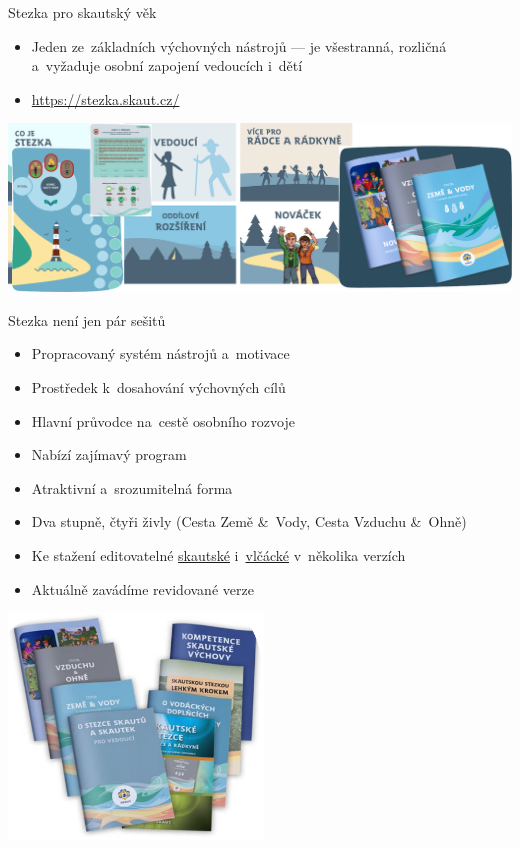\documentclass[compress, xelatex, 11pt, xcolor=dvipsnames, print, aspectratio=169,
	hyperref={
		bookmarks=true,
		unicode=true,
		colorlinks=true,
		pdftitle={Skautska vychovna metoda},
		plainpages=false,
		pdfauthor={Vojtech Zeisek},
		pdfsubject={Skautska vychovna metoda a jeji vyvoj za posledni stoleti a desetileti},
		pdfcreator={XeLaTeX},
		pdfkeywords={Junak, Pedagogika, Skaut, Skauting, Vychovna metoda},
		linkcolor=Red, %
		anchorcolor=ForestGreen, %
		citecolor=ForestGreen, %
		filecolor=ForestGreen, %
		menucolor=ForestGreen, %
		urlcolor=Sepia, %
		pdftex},
	url={hyphens, lowtilde} %
	]{beamer}
\begin{document}
\begin{frame}{Stezka pro skautský věk}
	\begin{itemize}
		\item Jeden ze~základních výchovných nástrojů --- je všestranná, rozličná a~vyžaduje osobní zapojení vedoucích i~dětí
		\item \url{https://stezka.skaut.cz/}
	\end{itemize}
	\begin{center}
		\includegraphics[width=\textwidth]{stezka.png}
	\end{center}
\end{frame}

\begin{frame}{Stezka není jen pár sešitů}
	\begin{multicols}{2}
		\begin{itemize}
			\item Propracovaný systém nástrojů a~motivace
			\item Prostředek k~dosahování výchovných cílů
			\item Hlavní průvodce na~cestě osobního rozvoje
			\item Nabízí zajímavý program
			\item Atraktivní a~srozumitelná forma
			\item Dva stupně, čtyři živly (Cesta Země \&~Vody, Cesta Vzduchu \&~Ohně)
			\item Ke stažení editovatelné \href{https://krizovatka.skaut.cz/skautky-skauti/stezky/ke-stazeni}{skautské} i~\href{https://krizovatka.skaut.cz/svetlusky-zabicky-vlcata/stezky-a-cesticky-vlcat-svetlusek-a-zabicek}{vlčácké} v~několika verzích
			\item Aktuálně zavádíme revidované verze
		\end{itemize}
		\columnbreak
		\begin{center}
			\includegraphics[height=6cm]{stezky.png}
		\end{center}
	\end{multicols}
\end{frame}
\end{document}
